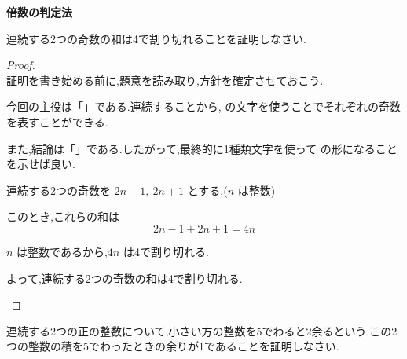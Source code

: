 \begin{techniquebox}{\textbf{倍数の判定法}}
  \label{techniquebox:倍数の判定法}
  \begin{techniquetable}[11.5em]
  \end{techniquetable}
\end{techniquebox}
\newpage

\begin{example}[1]
  連続する2つの奇数の和は4で割り切れることを証明しなさい.
\end{example}
\vspace{-3.5em}

\begin{proof}\mbox{}\\
  証明を書き始める前に,題意を読み取り,方針を確定させておこう.

  今回の主役は「」である.連続することから,\fitblankbf[1種類]{} の文字を使うことでそれぞれの奇数を表すことができる.

  また,結論は「\fitblankbf[4で割り切れること]{}」である.したがって,最終的に1種類文字を使って  の形になることを示せば良い.
\vspace{1.5em}

  \begin{hiddenanswer}
  連続する2つの奇数を $2n-1,\ 2n+1$ とする.($n$ は整数)

  このとき,これらの和は
  \[2n-1 + 2n+1 = 4n\]

\vspace{1em}
  $n$ は整数であるから,$4n$ は4で割り切れる.

  よって,連続する2つの奇数の和は4で割り切れる.
  \end{hiddenanswer}
\end{proof}

\begin{example}[2]
  連続する2つの正の整数について,小さい方の整数を5でわると2余るという.この2つの整数の積を5でわったときの余りが1であることを証明しなさい.
\end{example}
\vspace{-3.5em}

